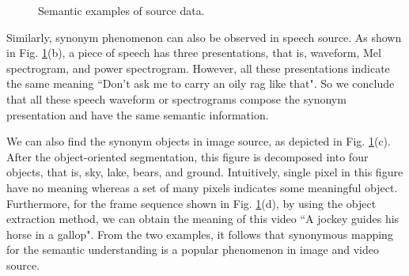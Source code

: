 \documentclass[12pt, draftclsnofoot,onecolumn]{IEEEtran}
\begin{document}
\begin{figure}[htbp]
\setlength{\abovecaptionskip}{0.cm}
\setlength{\belowcaptionskip}{-0.cm}
  \caption{Semantic examples of source data.}\label{source_synonym_example}
\end{figure}

Similarly, synonym phenomenon can also be observed in speech source. As shown in Fig. \ref{source_synonym_example}(b), a piece of speech has three presentations, that is, waveform, Mel spectrogram, and power spectrogram. However, all these presentations indicate the same meaning ``Don't ask me to carry an oily rag like that". So we conclude that all these speech waveform or spectrograms compose the synonym presentation and have the same semantic information.

We can also find the synonym objects in image source, as depicted in Fig. \ref{source_synonym_example}(c). After the object-oriented segmentation, this figure is decomposed into four objects, that is, sky, lake, bears, and ground. Intuitively, single pixel in this figure have no meaning whereas a set of many pixels indicates some meaningful object. Furthermore, for the frame sequence shown in Fig. \ref{source_synonym_example}(d), by using the object extraction method, we can obtain the meaning of this video ``A jockey guides his horse in a gallop". From the two examples, it follows that synonymous mapping for the semantic understanding is a popular phenomenon in image and video source.
\end{document}
